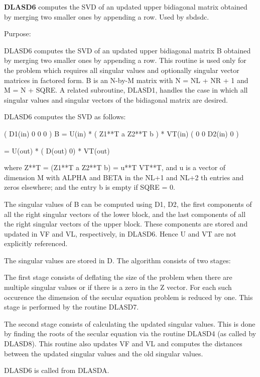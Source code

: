 {\bfseries D\+L\+A\+S\+D6} computes the S\+V\+D of an updated upper bidiagonal matrix obtained by merging two smaller ones by appending a row. Used by sbdsdc. 

 \begin{DoxyParagraph}{Purpose\+: }
\begin{DoxyVerb} DLASD6 computes the SVD of an updated upper bidiagonal matrix B
 obtained by merging two smaller ones by appending a row. This
 routine is used only for the problem which requires all singular
 values and optionally singular vector matrices in factored form.
 B is an N-by-M matrix with N = NL + NR + 1 and M = N + SQRE.
 A related subroutine, DLASD1, handles the case in which all singular
 values and singular vectors of the bidiagonal matrix are desired.

 DLASD6 computes the SVD as follows:

               ( D1(in)    0    0       0 )
   B = U(in) * (   Z1**T   a   Z2**T    b ) * VT(in)
               (   0       0   D2(in)   0 )

     = U(out) * ( D(out) 0) * VT(out)

 where Z**T = (Z1**T a Z2**T b) = u**T VT**T, and u is a vector of dimension M
 with ALPHA and BETA in the NL+1 and NL+2 th entries and zeros
 elsewhere; and the entry b is empty if SQRE = 0.

 The singular values of B can be computed using D1, D2, the first
 components of all the right singular vectors of the lower block, and
 the last components of all the right singular vectors of the upper
 block. These components are stored and updated in VF and VL,
 respectively, in DLASD6. Hence U and VT are not explicitly
 referenced.

 The singular values are stored in D. The algorithm consists of two
 stages:

       The first stage consists of deflating the size of the problem
       when there are multiple singular values or if there is a zero
       in the Z vector. For each such occurence the dimension of the
       secular equation problem is reduced by one. This stage is
       performed by the routine DLASD7.

       The second stage consists of calculating the updated
       singular values. This is done by finding the roots of the
       secular equation via the routine DLASD4 (as called by DLASD8).
       This routine also updates VF and VL and computes the distances
       between the updated singular values and the old singular
       values.

 DLASD6 is called from DLASDA.\end{DoxyVerb}
 
\end{DoxyParagraph}

